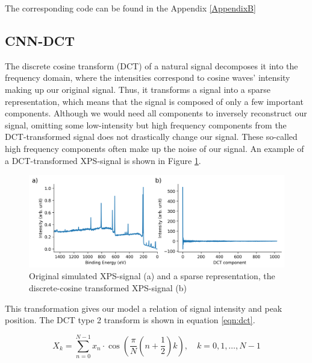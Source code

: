 The corresponding code can be found in the Appendix \ref{AppendixB}


\subsection{CNN-DCT}
The discrete cosine transform (DCT) of a natural signal decomposes it into the frequency domain, where the intensities correspond to cosine waves' intensity making up our original signal. Thus, it transforms a signal into a sparse representation, which means that the signal is composed of only a few important components. Although we would need all components to inversely reconstruct our signal, omitting some low-intensity but high frequency components from the DCT-transformed signal does not drastically change our signal. These so-called high frequency components often make up the noise of our signal. An example of a DCT-transformed XPS-signal is shown in Figure \ref{fig:dct}.

\begin{figure}[H]
    \centering
    \includegraphics[width=\textwidth]{Figures/dct.png}
    \caption{Original simulated XPS-signal (a) and a sparse representation, the discrete-cosine transformed XPS-signal (b)}
    \label{fig:dct}
\end{figure}

This transformation gives our model a relation of signal intensity and peak position. The DCT type 2 transform is shown in equation \ref{eqn:dct}.

\begin{equation}
\label{eqn:dct}
X_k = \sum_{n=0}^{N-1} x_n \cdot \cos\left(\frac{\pi}{N}\left(n + \frac{1}{2}\right)k\right), \quad k = 0, 1, \ldots, N-1
\end{equation}

